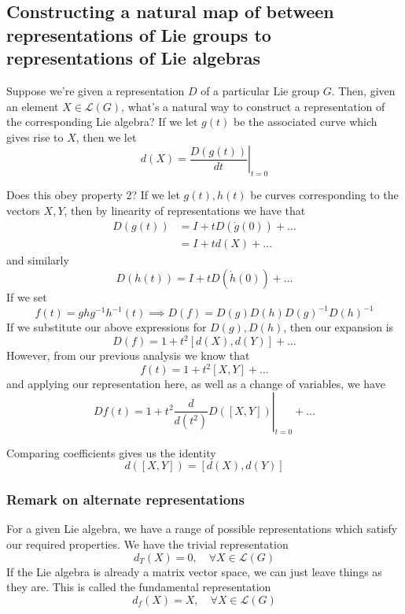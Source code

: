 \subsection{Constructing a natural map of between representations of Lie groups to representations of Lie algebras}

Suppose we're given a representation $D$ of a particular Lie group $G$. Then, given an element $X \in \mathcal{L}(G) $, what's a natural way to construct a representation of the corresponding Lie algebra? If we let $g(t)$ be the associated curve which gives rise to $X$, then we let\[ d(X) = \left. \frac{D(g(t))}{dt}\right\vert_{t = 0} \]

Does this obey property 2? If we let $g(t), h(t)$ be curves corresponding to the vectors $X, Y$, then by linearity of representations we have that 
\begin{align*}
D(g(t)) &= I + t D(\dot{g}(0)) + \dots \\ &= I + t d(X) + \dots  
\end{align*}
and similarly \[ D(h(t)) = I + t D(\dot{h}(0)) + \dots \]
If we set 
\[
f(t) = ghg^{-1}h^{-1}(t) \implies D(f) = D(g)D(h)D(g)^{-1}D(h)^{-1} 
\]
If we substitute our above expressions for $D(g), D(h)$, then our expansion is 
\[
D(f) = 1 + t^2 [d(X), d(Y)] + \dots 
\]
However, from our previous analysis we know that 
\[ f(t) = 1 + t^2 [X, Y] + \dots \] 
and applying our representation here, as well as a change of variables, we have \[ Df(t) = 1 + t^2 \left. \frac{d}{d(t^2)} D([X, Y]) \right\vert_{t = 0} + \dots \]

Comparing coefficients gives us the identity \[ d([X, Y]) = [d(X), d(Y)] \]

\subsubsection{Remark on alternate representations}
For a given Lie algebra, we have a range of possible representations which satisfy our required properties. We have the trivial representation \[ d_T(X) = 0, \quad \forall X \in \mathcal{L}(G) \]
If the Lie algebra is already a matrix vector space, we can just leave things as they are. This is called the fundamental representation
\[ d_f(X) = X, \quad \forall X \in \mathcal{L}(G) \]

\pagebreak 

